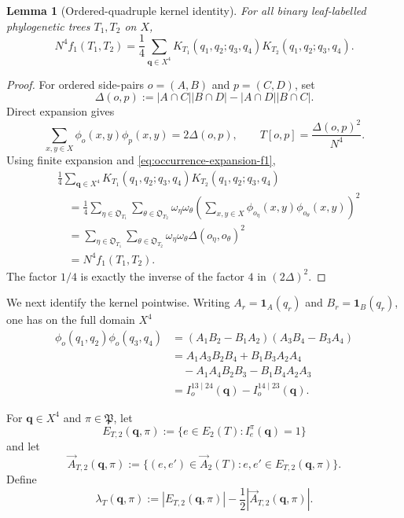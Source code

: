 \documentclass[11pt]{article}
\newtheorem{lemma}[theorem]{Lemma}
\newcommand{\ind}{\mathbf 1}
\begin{document}
\begin{lemma}[Ordered-quadruple kernel identity]
\label{lem:ordered-quadruple-kernel}
For all binary leaf-labelled phylogenetic trees $T_1,T_2$ on $X$,
\begin{equation}\label{eq:ordered-quadruple-kernel}
 N^4 f_1(T_1,T_2)
 =\frac14\sum_{\boldsymbol q\in X^4}
 K_{T_1}(q_1,q_2;q_3,q_4)
 K_{T_2}(q_1,q_2;q_3,q_4).
\end{equation}
\end{lemma}

\begin{proof}
For ordered side-pairs $o=(A,B)$ and $p=(C,D)$, set
\[
 \Delta(o,p):=|A\cap C||B\cap D|-|A\cap D||B\cap C|.
\]
Direct expansion gives
\[
 \sum_{x,y\in X}\phi_o(x,y)\phi_p(x,y)=2\Delta(o,p),
 \qquad
 T[o,p]=\frac{\Delta(o,p)^2}{N^4}.
\]
Using finite expansion and \eqref{eq:occurrence-expansion-f1},
\begin{align*}
&\frac14\sum_{\boldsymbol q\in X^4}
 K_{T_1}(q_1,q_2;q_3,q_4)K_{T_2}(q_1,q_2;q_3,q_4)\\
&\quad=\frac14\sum_{\eta\in\mathfrak O_{T_1}}
 \sum_{\theta\in\mathfrak O_{T_2}}\omega_\eta\omega_\theta
 \left(\sum_{x,y\in X}
 \phi_{o_\eta}(x,y)\phi_{o_\theta}(x,y)\right)^2\\
&\quad=\sum_{\eta\in\mathfrak O_{T_1}}
 \sum_{\theta\in\mathfrak O_{T_2}}
 \omega_\eta\omega_\theta\Delta(o_\eta,o_\theta)^2\\
&\quad=N^4f_1(T_1,T_2).
\end{align*}
The factor $1/4$ is exactly the inverse of the factor $4$ in
$(2\Delta)^2$.
\end{proof}

We next identify the kernel pointwise.  Writing
$A_r=\ind_A(q_r)$ and $B_r=\ind_B(q_r)$, one has on the full domain $X^4$
\begin{equation}\label{eq:phi-positional-indicator}
\begin{aligned}
 \phi_o(q_1,q_2)\phi_o(q_3,q_4)
 &=(A_1B_2-B_1A_2)(A_3B_4-B_3A_4)\\
 &=A_1A_3B_2B_4+B_1B_3A_2A_4\\
 &\quad-A_1A_4B_2B_3-B_1B_4A_2A_3\\
 &=I_o^{13\mid24}(\boldsymbol q)
  -I_o^{14\mid23}(\boldsymbol q).
\end{aligned}
\end{equation}

For $\boldsymbol q\in X^4$ and $\pi\in\mathfrak P$, let
\[
 E_{T,2}(\boldsymbol q,\pi)
 :=\{e\in E_2(T):I_e^\pi(\boldsymbol q)=1\}
\]
and let
\[
 \overrightarrow A_{T,2}(\boldsymbol q,\pi)
 :=\{(e,e')\in\overrightarrow A_2(T):
 e,e'\in E_{T,2}(\boldsymbol q,\pi)\}.
\]
Define
\begin{equation}\label{eq:positional-path-weight}
 \lambda_T(\boldsymbol q,\pi)
 :=|E_{T,2}(\boldsymbol q,\pi)|
 -\frac12|\overrightarrow A_{T,2}(\boldsymbol q,\pi)|.
\end{equation}
\end{document}
